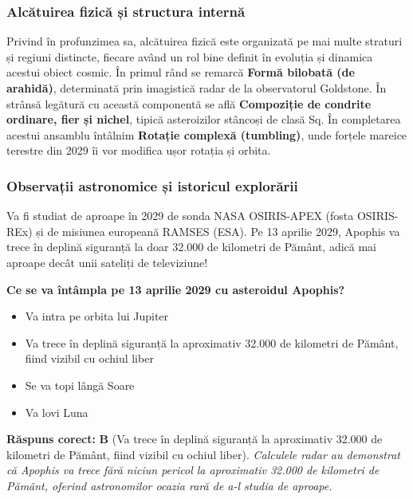 \subsubsection*{Alcătuirea fizică și structura internă}
Privind în profunzimea sa, alcătuirea fizică este organizată pe mai multe straturi și regiuni distincte, fiecare având un rol bine definit în evoluția și dinamica acestui obiect cosmic. În primul rând se remarcă \textbf{Formă bilobată (de arahidă)}, determinată prin imagistică radar de la observatorul Goldstone. În strânsă legătură cu această componentă se află \textbf{Compoziție de condrite ordinare, fier și nichel}, tipică asteroizilor stâncoși de clasă Sq. În completarea acestui ansamblu întâlnim \textbf{Rotație complexă (tumbling)}, unde forțele mareice terestre din 2029 îi vor modifica ușor rotația și orbita.

\subsubsection*{Observații astronomice și istoricul explorării}
Va fi studiat de aproape în 2029 de sonda NASA OSIRIS-APEX (fosta OSIRIS-REx) și de misiunea europeană RAMSES (ESA). Pe 13 aprilie 2029, Apophis va trece în deplină siguranță la doar 32.000 de kilometri de Pământ, adică mai aproape decât unii sateliți de televiziune!

\vspace{6pt}
\begin{tcolorbox}[orbitarquiz, title={\textbf{Întrebare de verificare \#42: 99942 Apophis}}]
\textbf{Ce se va întâmpla pe 13 aprilie 2029 cu asteroidul Apophis?}
\begin{itemize}[leftmargin=2.2em, itemsep=2pt, topsep=4pt]
  \item[$\square$ \textbf{A.}] Va intra pe orbita lui Jupiter
  \item[$\square$ \textbf{B.}] Va trece în deplină siguranță la aproximativ 32.000 de kilometri de Pământ, fiind vizibil cu ochiul liber
  \item[$\square$ \textbf{C.}] Se va topi lângă Soare
  \item[$\square$ \textbf{D.}] Va lovi Luna
\end{itemize}
\vspace{2pt}
{\footnotesize\color{orbitarMuted}\textbf{Răspuns corect:} \textbf{B} (Va trece în deplină siguranță la aproximativ 32.000 de kilometri de Pământ, fiind vizibil cu ochiul liber). \emph{Calculele radar au demonstrat că Apophis va trece fără niciun pericol la aproximativ 32.000 de kilometri de Pământ, oferind astronomilor ocazia rară de a-l studia de aproape.}}
\end{tcolorbox}
\clearpage

